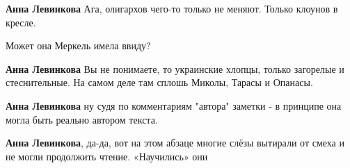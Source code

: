 \begin{itemize}
\begin{itemize}
 
\textbf{Анна Левинкова} Ага, олигархов чего-то только не меняют. Только клоунов в кресле.

 
Может она Меркель имела ввиду?

 
\textbf{Анна Левинкова} Вы не понимаете, то украинские хлопцы, только загорелые и стеснительные. На самом деле там сплошь Миколы, Тарасы и Опанасы.

 
\textbf{Анна Левинкова} ну судя по комментариям "автора" заметки - в принципе она могла быть реально автором текста.

 
\textbf{Анна Левинкова}, да-да, вот на этом абзаце многие слёзы вытирали от смеха и не могли продолжить чтение. «Научились» они🤣
\end{itemize}

\end{itemize}

